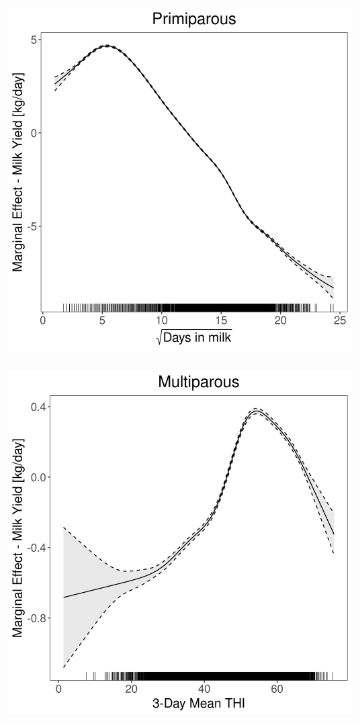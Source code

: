 \begin{figure}[H]
\begin{subfigure}[b]{0.45\textwidth}
    \end{subfigure}
    \hspace{0.05\textwidth} %
    \begin{subfigure}[b]{0.45\textwidth}
        \centering
        \includegraphics[width=\textwidth]{thesis/figures/models/milk/before2010/sf_milk_before2010/sf_milk_before2010_marginal_dim_milk_primi.png}
    \end{subfigure}
    \begin{subfigure}[b]{0.45\textwidth}
        \centering
        \includegraphics[width=\textwidth]{thesis/figures/models/milk/before2010/sf_milk_before2010/sf_milk_before2010_marginal_thi_milk_multi.png}

\end{subfigure}
\end{figure}
